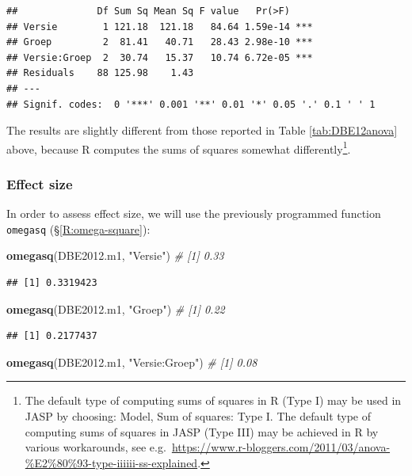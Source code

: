 \documentclass[
]{book}
\newenvironment{Shaded}{\begin{snugshade}}{\end{snugshade}}
\newcommand{\CommentTok}[1]{\textcolor[rgb]{0.56,0.35,0.01}{\textit{#1}}}
\newcommand{\FunctionTok}[1]{\textcolor[rgb]{0.13,0.29,0.53}{\textbf{#1}}}
\newcommand{\NormalTok}[1]{#1}
\newcommand{\StringTok}[1]{\textcolor[rgb]{0.31,0.60,0.02}{#1}}
\begin{document}
\begin{verbatim}
##              Df Sum Sq Mean Sq F value   Pr(>F)    
## Versie        1 121.18  121.18   84.64 1.59e-14 ***
## Groep         2  81.41   40.71   28.43 2.98e-10 ***
## Versie:Groep  2  30.74   15.37   10.74 6.72e-05 ***
## Residuals    88 125.98    1.43                     
## ---
## Signif. codes:  0 '***' 0.001 '**' 0.01 '*' 0.05 '.' 0.1 ' ' 1
\end{verbatim}

The results are slightly different from those reported in Table \ref{tab:DBE12anova} above, because R computes the sums of squares somewhat differently\footnote{The default type of computing sums of squares in R (Type I) may be used in JASP by choosing: Model, Sum of squares: Type I. The default type of computing sums of squares in JASP (Type III) may be achieved in R by various workarounds, see e.g.~\url{https://www.r-bloggers.com/2011/03/anova-\%E2\%80\%93-type-iiiiii-ss-explained}.}.

\hypertarget{effectsize}{%
\subsubsection{Effect size}\label{effectsize}}

In order to assess effect size, we will use the previously programmed function \texttt{omegasq}
(§\ref{R:omega-square}):

\begin{Shaded}
\begin{Highlighting}[]
\FunctionTok{omegasq}\NormalTok{(DBE2012.m1, }\StringTok{"Versie"}\NormalTok{)        }\CommentTok{\# [1] 0.33}
\end{Highlighting}
\end{Shaded}

\begin{verbatim}
## [1] 0.3319423
\end{verbatim}

\begin{Shaded}
\begin{Highlighting}[]
\FunctionTok{omegasq}\NormalTok{(DBE2012.m1, }\StringTok{"Groep"}\NormalTok{)         }\CommentTok{\# [1] 0.22}
\end{Highlighting}
\end{Shaded}

\begin{verbatim}
## [1] 0.2177437
\end{verbatim}

\begin{Shaded}
\begin{Highlighting}[]
\FunctionTok{omegasq}\NormalTok{(DBE2012.m1, }\StringTok{"Versie:Groep"}\NormalTok{)  }\CommentTok{\# [1] 0.08}
\end{Highlighting}
\end{Shaded}
\end{document}
